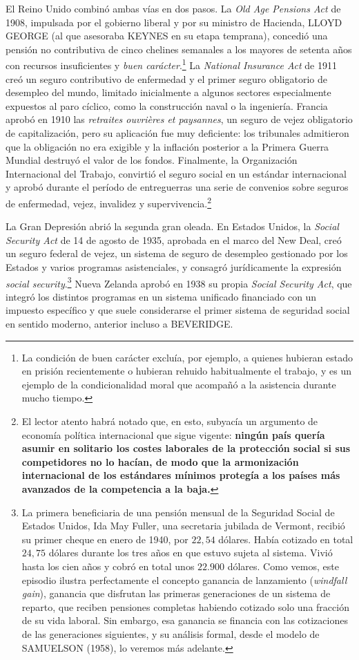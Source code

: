 \documentclass[10pt,a4paper]{article}
\begin{document}
El Reino Unido combinó ambas vías en dos pasos. La \textit{Old Age Pensions Act} de 1908, impulsada por el gobierno liberal y por su ministro de Hacienda, LLOYD GEORGE (al que asesoraba KEYNES en su etapa temprana), concedió una pensión no contributiva de cinco chelines semanales a los mayores de setenta años con recursos insuficientes y \textit{buen carácter}.\footnote{La condición de buen carácter excluía, por ejemplo, a quienes hubieran estado en prisión recientemente o hubieran rehuido habitualmente el trabajo, y es un ejemplo de la condicionalidad moral que acompañó a la asistencia durante mucho tiempo.
} La \textit{National Insurance Act} de 1911 creó un seguro contributivo de enfermedad y el primer seguro obligatorio de desempleo del mundo, limitado inicialmente a algunos sectores especialmente expuestos al paro cíclico, como la construcción naval o la ingeniería. Francia aprobó en 1910 las \textit{retraites ouvrières et paysannes}, un seguro de vejez obligatorio de capitalización, pero su aplicación fue muy deficiente: los tribunales admitieron que la obligación no era exigible y la inflación posterior a la Primera Guerra Mundial destruyó el valor de los fondos. Finalmente, la Organización Internacional del Trabajo, convirtió el seguro social en un estándar internacional y aprobó durante el período de entreguerras una serie de convenios sobre seguros de enfermedad, vejez, invalidez y supervivencia.\footnote{El lector atento habrá notado que, en esto, subyacía un argumento de economía política internacional que sigue vigente: \textbf{ningún país quería asumir en solitario los costes laborales de la protección social si sus competidores no lo hacían, de modo que la armonización internacional de los estándares mínimos protegía a los países más avanzados de la competencia a la baja.}
}

La Gran Depresión abrió la segunda gran oleada. En Estados Unidos, la \textit{Social Security Act} de 14 de agosto de 1935, aprobada en el marco del New Deal, creó un seguro federal de vejez, un sistema de seguro de desempleo gestionado por los Estados y varios programas asistenciales, y consagró jurídicamente la expresión \textit{social security}.\footnote{La primera beneficiaria de una pensión mensual de la Seguridad Social de Estados Unidos, Ida May Fuller, una secretaria jubilada de Vermont, recibió su primer cheque en enero de 1940, por $22,54$ dólares. Había cotizado en total $24,75$ dólares durante los tres años en que estuvo sujeta al sistema. Vivió hasta los cien años y cobró en total unos $22.900$ dólares. Como vemos, este episodio ilustra perfectamente el concepto ganancia de lanzamiento (\textit{windfall gain}), ganancia que disfrutan las primeras generaciones de un sistema de reparto, que reciben pensiones completas habiendo cotizado solo una fracción de su vida laboral. Sin embargo, esa ganancia se financia con las cotizaciones de las generaciones siguientes, y su análisis formal, desde el modelo de SAMUELSON (1958), lo veremos más adelante.
} Nueva Zelanda aprobó en 1938 su propia \textit{Social Security Act}, que integró los distintos programas en un sistema unificado financiado con un impuesto específico y que suele considerarse el primer sistema de seguridad social en sentido moderno, anterior incluso a BEVERIDGE.
\end{document}
